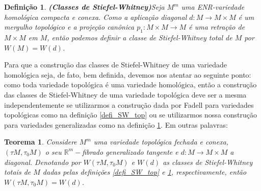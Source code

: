 \documentclass[12pt,oneside]{book} %
\newtheorem{defi}   {\hspace{0.5cm}Defini\c c\~ao}[chapter]
\newtheorem{teo}    {\hspace{0.5cm}Teorema}[chapter]
\newcommand{\R}{\mathbb{R}}
\begin{document}
\begin{defi}{\bf (Classes de Stiefel-Whitney)}\label{defi_SW_hom}
Seja $M^{m}$ uma ENR-variedade homológica compacta e conexa. Como a aplicação diagonal $d:M\to M\times M$ é um mergulho topológico e a projeção canônica $p_{1}:M\times M\to M$ é uma retração de $M\times M$ em $M$, então podemos definir a classe de Stiefel-Whitney total de $M$ por $W(M)=W(d)$.
\end{defi}

\par Para que a construção das classes de Stiefel-Whitney de uma variedade homológica seja, de fato, bem definida, devemos nos atentar ao seguinte ponto: como toda variedade topológica é uma variedade homológica, então a construção das classes de Stiefel-Whitney de uma variedade topológica deve ser a mesma independentemente se utilizarmos a construção dada por Fadell para variedades topológicas como na definição \ref{defi_SW_top} ou se utilizarmos nossa construção para variedades generalizadas como na definição \ref{defi_SW_hom}. Em outras palavras:

\begin{teo}\label{SW_tang_gen}
	Considere $M^{m}$ uma variedade topológica fechada e conexa, $(\tau M,\tau_{0}M)$ o seu $\R^{m}-$fibrado generalizado tangente e $d:M\to M\times M$ a diagonal. Denotando por $W(\tau M,\tau_{0}M)$ e $W(d)$ as classes de Stiefel-Whitney totais de $M$ dadas pelas definições \ref{defi_SW_top} e \ref{defi_SW_hom}, respectivamente, então $W(\tau M,\tau_{0}M)=W(d)$.
\end{teo}
\end{document}
